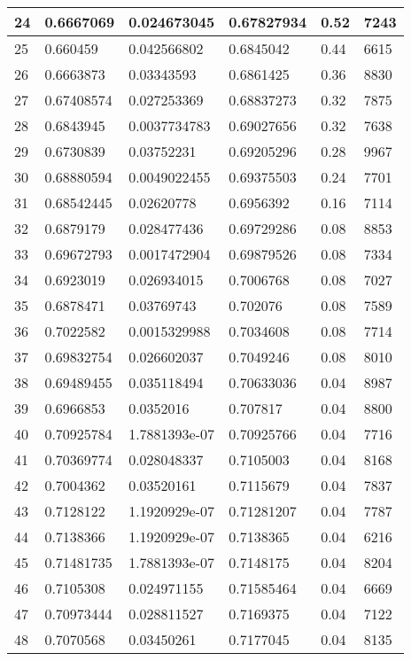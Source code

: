 \begin{longtable}{|l|l|l|l|l|l|}
24 & 0.6667069 & 0.024673045 & 0.67827934 & 0.52 & 7243 \\ \hline 
25 & 0.660459 & 0.042566802 & 0.6845042 & 0.44 & 6615 \\ \hline 
26 & 0.6663873 & 0.03343593 & 0.6861425 & 0.36 & 8830 \\ \hline 
27 & 0.67408574 & 0.027253369 & 0.68837273 & 0.32 & 7875 \\ \hline 
28 & 0.6843945 & 0.0037734783 & 0.69027656 & 0.32 & 7638 \\ \hline 
29 & 0.6730839 & 0.03752231 & 0.69205296 & 0.28 & 9967 \\ \hline 
30 & 0.68880594 & 0.0049022455 & 0.69375503 & 0.24 & 7701 \\ \hline 
31 & 0.68542445 & 0.02620778 & 0.6956392 & 0.16 & 7114 \\ \hline 
32 & 0.6879179 & 0.028477436 & 0.69729286 & 0.08 & 8853 \\ \hline 
33 & 0.69672793 & 0.0017472904 & 0.69879526 & 0.08 & 7334 \\ \hline 
34 & 0.6923019 & 0.026934015 & 0.7006768 & 0.08 & 7027 \\ \hline 
35 & 0.6878471 & 0.03769743 & 0.702076 & 0.08 & 7589 \\ \hline 
36 & 0.7022582 & 0.0015329988 & 0.7034608 & 0.08 & 7714 \\ \hline 
37 & 0.69832754 & 0.026602037 & 0.7049246 & 0.08 & 8010 \\ \hline 
38 & 0.69489455 & 0.035118494 & 0.70633036 & 0.04 & 8987 \\ \hline 
39 & 0.6966853 & 0.0352016 & 0.707817 & 0.04 & 8800 \\ \hline 
40 & 0.70925784 & 1.7881393e-07 & 0.70925766 & 0.04 & 7716 \\ \hline 
41 & 0.70369774 & 0.028048337 & 0.7105003 & 0.04 & 8168 \\ \hline 
42 & 0.7004362 & 0.03520161 & 0.7115679 & 0.04 & 7837 \\ \hline 
43 & 0.7128122 & 1.1920929e-07 & 0.71281207 & 0.04 & 7787 \\ \hline 
44 & 0.7138366 & 1.1920929e-07 & 0.7138365 & 0.04 & 6216 \\ \hline 
45 & 0.71481735 & 1.7881393e-07 & 0.7148175 & 0.04 & 8204 \\ \hline 
46 & 0.7105308 & 0.024971155 & 0.71585464 & 0.04 & 6669 \\ \hline 
47 & 0.70973444 & 0.028811527 & 0.7169375 & 0.04 & 7122 \\ \hline 
48 & 0.7070568 & 0.03450261 & 0.7177045 & 0.04 & 8135 \\ \hline 

\end{longtable}
